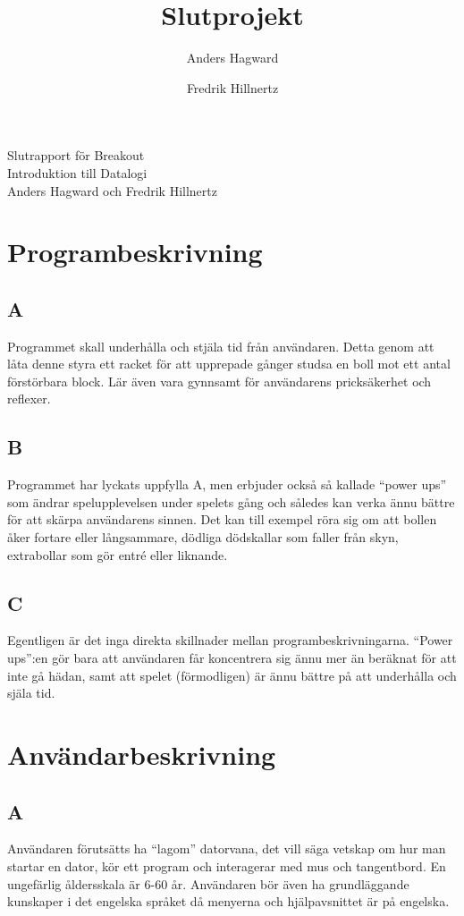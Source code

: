 \documentclass[11pt,a4paper]{article}
\author{Anders Hagward \and Fredrik Hillnertz}
\title{Slutprojekt}
\begin{document}
\thispagestyle{empty}
\begin{center}
\Huge Slutrapport för Breakout \\
\Large Introduktion till Datalogi \\
\normalsize Anders Hagward och Fredrik Hillnertz
\end{center}
\newpage

\tableofcontents
\newpage

\section{Programbeskrivning}

\subsection{A}
Programmet skall underhålla och stjäla tid från användaren. Detta genom att låta denne styra ett racket för att upprepade gånger studsa en boll mot ett antal förstörbara block. Lär även vara gynnsamt för användarens pricksäkerhet och reflexer.

\subsection{B}
Programmet har lyckats uppfylla A, men erbjuder också så kallade ``power ups'' som ändrar spelupplevelsen under spelets gång och således kan verka ännu bättre för att skärpa användarens sinnen. Det kan till exempel röra sig om att bollen åker fortare eller långsammare, dödliga dödskallar som faller från skyn, extrabollar som gör entré eller liknande.

\subsection{C}
Egentligen är det inga direkta skillnader mellan programbeskrivningarna. ``Power ups'':en gör bara att användaren får koncentrera sig ännu mer än beräknat för att inte gå hädan, samt att spelet (förmodligen) är ännu bättre på att underhålla och själa tid.

\section{Användarbeskrivning}

\subsection{A}
Användaren förutsätts ha ``lagom'' datorvana, det vill säga vetskap om hur man startar en dator, kör ett program och interagerar med mus och tangentbord. En ungefärlig åldersskala är 6-60 år. Användaren bör även ha grundläggande kunskaper i det engelska språket då menyerna och hjälpavsnittet är på engelska.
\end{document}
